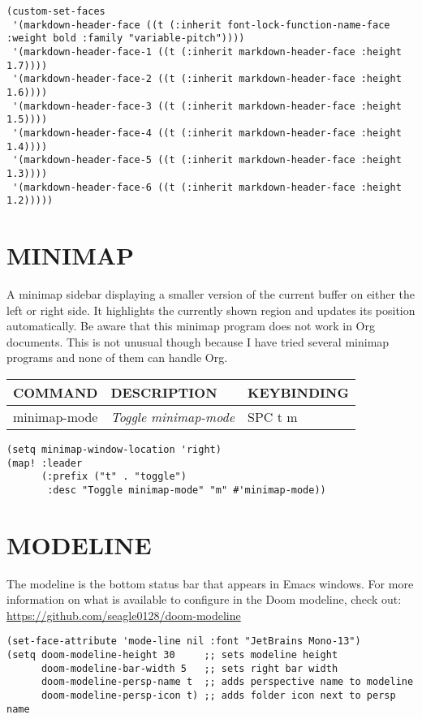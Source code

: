 \documentclass[11pt]{article}
\begin{document}
\begin{verbatim}
(custom-set-faces
 '(markdown-header-face ((t (:inherit font-lock-function-name-face :weight bold :family "variable-pitch"))))
 '(markdown-header-face-1 ((t (:inherit markdown-header-face :height 1.7))))
 '(markdown-header-face-2 ((t (:inherit markdown-header-face :height 1.6))))
 '(markdown-header-face-3 ((t (:inherit markdown-header-face :height 1.5))))
 '(markdown-header-face-4 ((t (:inherit markdown-header-face :height 1.4))))
 '(markdown-header-face-5 ((t (:inherit markdown-header-face :height 1.3))))
 '(markdown-header-face-6 ((t (:inherit markdown-header-face :height 1.2)))))

\end{verbatim}

\section{MINIMAP}
\label{sec:org78c277a}
A minimap sidebar displaying a smaller version of the current buffer on either the left or right side. It highlights the currently shown region and updates its position automatically.  Be aware that this minimap program does not work in Org documents.  This is not unusual though because I have tried several minimap programs and none of them can handle Org.

\begin{center}
\begin{tabular}{lll}
COMMAND & DESCRIPTION & KEYBINDING\\[0pt]
\hline
minimap-mode & \emph{Toggle minimap-mode} & SPC t m\\[0pt]
\end{tabular}
\end{center}

\begin{verbatim}
(setq minimap-window-location 'right)
(map! :leader
      (:prefix ("t" . "toggle")
       :desc "Toggle minimap-mode" "m" #'minimap-mode))
\end{verbatim}

\section{MODELINE}
\label{sec:org2ce37ea}
The modeline is the bottom status bar that appears in Emacs windows.  For more information on what is available to configure in the Doom modeline, check out:
\url{https://github.com/seagle0128/doom-modeline}

\begin{verbatim}
(set-face-attribute 'mode-line nil :font "JetBrains Mono-13")
(setq doom-modeline-height 30     ;; sets modeline height
      doom-modeline-bar-width 5   ;; sets right bar width
      doom-modeline-persp-name t  ;; adds perspective name to modeline
      doom-modeline-persp-icon t) ;; adds folder icon next to persp name
\end{verbatim}
\end{document}
